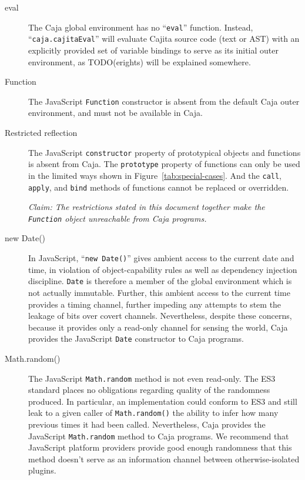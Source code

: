 \documentclass[letterpaper,twocolumn,10pt]{article}
\newcommand{\code}[1]{{\tt {#1}}}              %
\begin{document}
\begin{description}

    \item[eval] The Caja global environment has no ``\code{eval}'' function. 
    Instead, ``\code{caja.cajitaEval}'' will evaluate Cajita source code (text or 
    AST) with an explicitly provided set of variable bindings to serve as its 
    initial outer environment, as TODO(erights) will be explained somewhere.
    
    \item[Function] The JavaScript \code{Function} constructor is absent from 
    the default Caja outer environment, and must not be available in Caja.
    
    \item[Restricted reflection] The JavaScript \code{constructor} property of 
    prototypical objects and functions is absent from Caja. The \code{prototype} property of functions can only be
    used in the limited ways shown in Figure~\ref{tab:special-cases}. And the \code{call}, \code{apply}, and
    \code{bind} methods of functions cannot be replaced or overridden.
    
    \emph{Claim: The restrictions stated in this document together make the 
    \code{Function} object unreachable from Caja programs.}

    \item[new Date()] In JavaScript, ``\code{new Date()}''  gives ambient 
    access to the current date and time, in violation of object-capability 
    rules as well as dependency injection discipline. \code{Date} is 
    therefore a member of the global environment which is not actually 
    immutable. Further, this ambient access to the current time provides a 
    timing channel, further impeding any attempts to stem the leakage of bits 
    over covert channels. Nevertheless, despite these concerns, because it 
    provides only a read-only channel for sensing the world, Caja provides 
    the JavaScript \code{Date} constructor to Caja programs.

    \item[Math.random()] The JavaScript \code{Math.random} method is not even 
    read-only. The ES3 standard places no obligations regarding quality of the
    randomness produced. In particular, an implementation could conform to ES3
    and still leak to a given caller of \code{Math.random()} the ability to
    infer how many previous times it had been called. Nevertheless, Caja
    provides the JavaScript \code{Math.random} method to Caja programs. We
    recommend that JavaScript platform providers provide good enough
    randomness that this method doesn't serve as an information channel
    between otherwise-isolated plugins.
    
\end{description}
\end{document}

